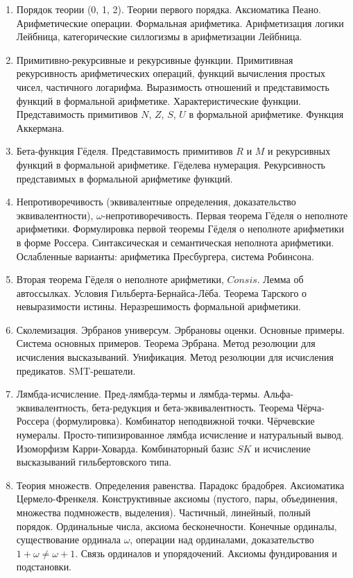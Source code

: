 \documentclass[11pt,a4paper,oneside]{scrartcl}
\begin{document}
\begin{enumerate}
\item Порядок теории (0, 1, 2). Теории первого порядка. Аксиоматика Пеано. Арифметические операции. 
Формальная арифметика. Арифметизация логики Лейбница, категорические силлогизмы в арифметизации Лейбница.
\item Примитивно-рекурсивные и рекурсивные функции. Примитивная рекурсивность арифметических операций, 
функций вычисления простых чисел, частичного логарифма.
Выразимость отношений и представимость функций в формальной арифметике. Характеристические функции.
Представимость примитивов $N$, $Z$, $S$, $U$ в формальной арифметике.
Функция Аккермана.
\item Бета-функция Гёделя. Представимость примитивов $R$ и $M$ и рекурсивных функций в формальной арифметике.
Гёделева нумерация. Рекурсивность представимых в формальной арифметике функций.
\item Непротиворечивость (эквивалентные определения, доказательство эквивалентности), $\omega$-не\-про\-ти\-во\-ре\-чи\-вость. 
Первая теорема Гёделя о неполноте арифметики.
Формулировка первой теоремы Гёделя о неполноте арифметики в форме Россера. 
Синтаксическая и семантическая неполнота арифметики.
Ослабленные варианты: арифметика Пресбургера, система Робинсона.
\item Вторая теорема Гёделя о неполноте арифметики, $Consis$. 
Лемма об автоссылках. Условия Гильберта-Бернайса-Лёба. Теорема Тарского о невыразимости истины. Неразрешимость формальной
арифметики.
\item Сколемизация. Эрбранов универсум. Эрбрановы оценки. Основные примеры. Система основных примеров. Теорема Эрбрана.
Метод резолюции для исчисления высказываний. Унификация. Метод резолюции для исчисления предикатов. SMT-решатели.
\item Лямбда-исчисление. Пред-лямбда-термы и лямбда-термы. Альфа-эквивалентность, бета-редукция
и бета-эквивалентность. Теорема Чёрча-Россера (формулировка). Комбинатор неподвижной точки. 
Чёрчевские нумералы. 
Просто-типизированное лямбда исчисление и натуральный вывод. Изоморфизм Карри-Ховарда.
Комбинаторный базис $SK$ и исчисление высказываний гильбертовского типа.
\item Теория множеств. Определения равенства. Парадокс брадобрея. Аксиоматика Цермело-Френкеля. Конструктивные аксиомы
(пустого, пары, объединения, множества подмножеств, выделения).
Частичный, линейный, полный порядок. Ординальные числа, аксиома бесконечности. 
Конечные ординалы, существование ординала $\omega$, операции над ординалами, 
доказательство $1+\omega\ne\omega+1$. Связь ординалов и упорядочений. Аксиомы фундирования и подстановки.

\end{enumerate}
\end{document}
